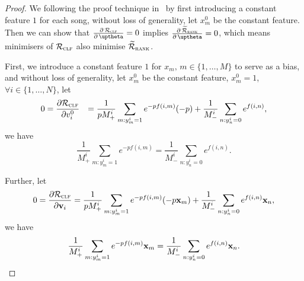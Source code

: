 \begin{proof}
We following the proof technique in~\cite{ertekin2011equivalence}
by first introducing a constant feature $1$ for each song,
without loss of generality, let $x_m^0$ be the constant feature.
Then we can show that
$\frac{\partial \, \RCal_\textsc{clf}} {\partial \, \uptheta} = 0$ implies
$\frac{\partial \, \widetilde\RCal_\textsc{rank}} {\partial \, \uptheta} = 0$,
which means minimisers of $\mathcal{R}_\textsc{clf}$ also minimise $\widetilde{\mathcal{R}}_\textsc{rank}$.

First, we introduce a constant feature $1$ for $x_m, \, m \in \{1,\dots,M\}$ to serve as a bias, 
and without loss of generality, let $x_m^0$ be the constant feature, \ie $x_m^0 = 1$, 
$\forall i \in \{1,\dots,N\}$, let
\begin{equation*}
\begin{aligned}
0 
&= \frac{\partial \mathcal{R}_\textsc{clf}} {\partial v_i^0}
&= \frac{1}{p M_+^i} \sum_{m: y_m^i = 1} e^{-p f(i, m)} (-p) + \frac{1}{M_-^i} \sum_{n: y_n^i = 0} e^{f(i, n)},
\end{aligned}
\end{equation*}
we have
\begin{equation}
\label{eq:eq1}
\frac{1}{M_+^i} \sum_{m: y_m^i = 1} e^{-p f(i, m)} = \frac{1}{M_-^i} \sum_{n: y_n^i = 0} e^{f(i, n)}.
\end{equation}

Further, let
\begin{equation*}
0 
= \frac{\partial \mathcal{R}_\textsc{clf}} {\partial \mathbf{v}_i} 
= \frac{1}{p M_+^i} \sum_{m: y_m^i = 1} e^{-p f(i, m)} (-p \mathbf{x}_m) + \frac{1}{M_-^i} \sum_{n: y_n^i = 0} e^{f(i, n)} \mathbf{x}_n,
\end{equation*}
we have
\begin{equation}
\label{eq:eq2}
\frac{1}{M_+^i} \sum_{m: y_m^i = 1} e^{-p f(i, m)} \mathbf{x}_m = \frac{1}{M_-^i} \sum_{n: y_n^i = 0} e^{f(i, n)} \mathbf{x}_n.
\end{equation}


\end{proof}
